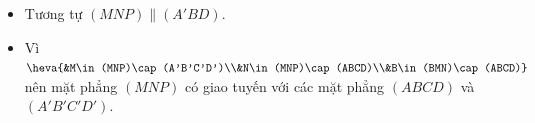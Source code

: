 \begin{ex}
{\begin{itemize}
			$\Rightarrow\heva{&I M  \parallel CN \\& IM=CN}$. Do vậy $IMNC$ là hình bình hành.\\
			 Suy ra $\heva{& MN\parallel IC\\ & IC\subset(B'D'C)}
			 \Rightarrow MN\parallel(B'D'C)$.(2)\\
			Từ (1) và (2) suy  ra $(MNP)\parallel(B'D'C)$.
			\item Tương tự $(MNP)\parallel(A'BD)$. 
			\item Vì $\heva{&M\in(MNP)\cap (A'B'C'D')\\&N\in(MNP)\cap (ABCD)\\&B\in(BMN)\cap (ABCD)}$ nên mặt phẳng $(MNP)$ có giao tuyến với các mặt phẳng $(ABCD)$  và $(A'B'C'D')$.
		\end{itemize}
	} 
\end{ex}

